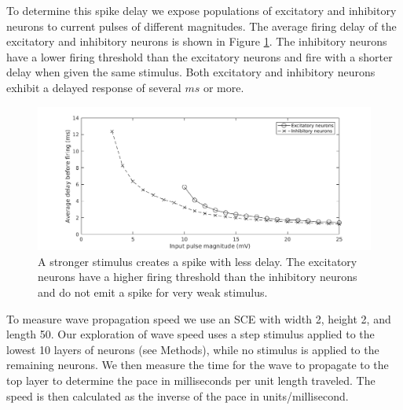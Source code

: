 \documentclass[12pt]{article}
\begin{document}
To determine this spike delay we expose populations of excitatory and inhibitory neurons to current pulses of different magnitudes.
The average firing delay of the excitatory and inhibitory neurons is shown in Figure \ref{fig:delay_neurondynamics}.
The inhibitory neurons have a lower firing threshold than the excitatory neurons \parencite{izhikevich2003} and fire with a shorter delay when given the same stimulus.
Both excitatory and inhibitory neurons exhibit a delayed response of several $ms$ or more.
\begin{figure}[!htb]
 \caption{ A stronger stimulus creates a spike with less delay. The excitatory neurons have a higher firing threshold than the inhibitory neurons and do not emit a spike for very weak stimulus.}
 \label{fig:delay_neurondynamics}
 \centering
   \includegraphics[width=\textwidth]{fig/WaveSpeed_NeuronDynamics}
\end{figure}

To measure wave propagation speed we use an SCE with width 2, height 2, and length 50.
Our exploration of wave speed uses a step stimulus applied to the lowest 10 layers of neurons (see Methods), while no stimulus is applied to the remaining neurons.
We then measure the time for the wave to propagate to the top layer to determine the pace in milliseconds per unit length traveled.
The speed is then calculated as the inverse of the pace in units/millisecond.
\end{document}
